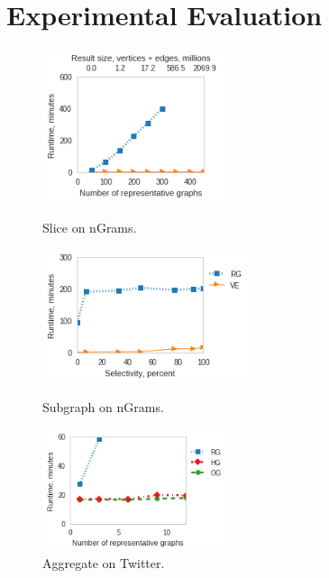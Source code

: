 \section{Experimental Evaluation}
\label{sec:exp}

\begin{figure}[t]
\vspace{-0.2in}
\centering
\begin{minipage}[b]{2.1in}
\centering
\includegraphics[width=2.1in]{figs/slice_ngrams_build13.png}
\vspace{-0.2in}
\caption{Slice on nGrams.}
\label{fig:slicengrams}
\vspace{-0.1in}
\end{minipage}
\begin{minipage}[b]{2.2in}
\centering
\includegraphics[width=2.4in]{figs/subgraph_ngrams_build13.png}
\vspace{-0.2in}
\caption{Subgraph on nGrams.}
\label{fig:subgraphngrams}
\vspace{-0.1in}
\end{minipage}
\begin{minipage}[b]{2.15in}
\includegraphics[width=2.15in]{figs/deg_twitter_build14.png}
\vspace{-0.2in}
\caption{Aggregate on Twitter.}
\label{fig:degtwitter}
\vspace{-0.1in}
\end{minipage}
\end{figure}

